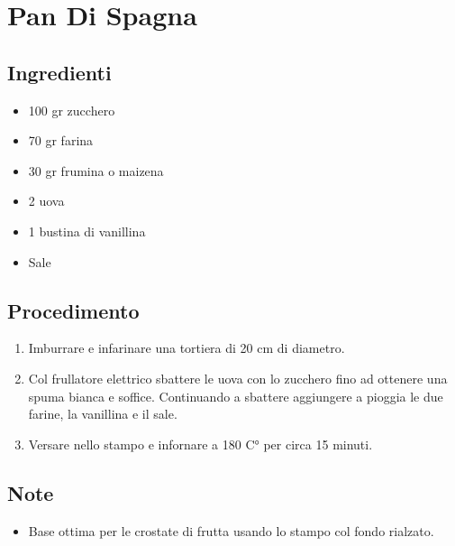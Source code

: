 \section{Pan Di Spagna}
\subsection{Ingredienti}
\begin{itemize}
\item 100 gr zucchero  
\item 70 gr farina  
\item 30 gr frumina o maizena  
\item 2 uova  
\item 1 bustina di vanillina  
\item Sale
\end{itemize}
\subsection{Procedimento}
\begin{enumerate}
\item  Imburrare e infarinare una tortiera di 20 cm di diametro.  
\item  Col frullatore elettrico sbattere le uova con lo zucchero fino ad ottenere una spuma bianca e soffice. Continuando a sbattere aggiungere a pioggia le due farine, la vanillina e il sale.  
\item  Versare nello stampo e infornare a 180 C° per circa 15 minuti.
\end{enumerate}
\subsection{Note}
\begin{itemize}
\item Base ottima per le crostate di frutta usando lo stampo col fondo rialzato.
\end{itemize}
